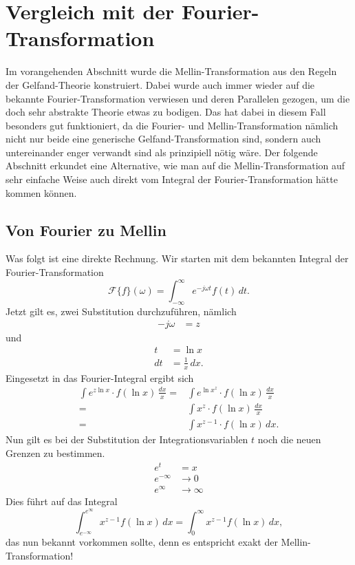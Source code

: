 %
%
%
%
\section{Vergleich mit der Fourier-Transformation
\label{mellin:section:teil3}}
Im vorangehenden Abschnitt wurde die Mellin-Transformation aus den 
Regeln der Gelfand-Theorie konstruiert. 
Dabei wurde auch immer wieder auf die bekannte Fourier-Transformation 
verwiesen und deren Parallelen gezogen, um die doch sehr abstrakte 
Theorie etwas zu bodigen.
Das hat dabei in diesem Fall besonders gut funktioniert, da die 
Fourier- und Mellin-Transformation nämlich nicht nur beide eine 
generische Gelfand-Transformation sind, sondern auch untereinander 
enger verwandt sind als prinzipiell nötig wäre.
Der folgende Abschnitt erkundet eine Alternative, wie man auf die 
Mellin-Transformation auf sehr einfache Weise auch direkt vom 
Integral der Fourier-Transformation hätte kommen können.

\subsection{Von Fourier zu Mellin
\label{mellin:subsection:foumel}}
Was folgt ist eine direkte Rechnung.
Wir starten mit dem bekannten Integral der Fourier-Trans\-for\-ma\-tion
\begin{equation}
    \mathcal{F}\{f \}(\omega) 
    = \int_{-\infty}^{\infty} e^{-j\omega{}t} f(t) \,{d}t
    .
    \label{mellin:fourier}
\end{equation}
Jetzt gilt es, zwei Substitution durchzuführen, nämlich
\begin{align*}
    -j\omega &= z
\end{align*}
und
\begin{align*}
    t &= \ln x \\
    {d}t &= \frac{1}{x}\,{d}x
    .
\end{align*}
Eingesetzt in das Fourier-Integral ergibt sich
\begin{align*}
    \int e^{z \ln x} \cdot f(\ln x) \,\frac{{d}x}{x}
    = &\int e^{\ln x^z} \cdot f(\ln x) \,\frac{{d}x}{x} \\
    = &\int x^{z} \cdot f(\ln x) \,\frac{{d}x}{x} \\
    = &\int x^{z-1} \cdot f(\ln x) \,{d}x
    .
\end{align*}
Nun gilt es bei der Substitution der Integrationsvariablen $t$ 
noch die neuen Grenzen zu bestimmen.
\begin{align*}
    e^{t} &= x \\
    e^{-\infty} &\rightarrow 0 \\
    e^{\infty} &\rightarrow \infty 
\end{align*}
Dies führt auf das Integral
\[
    \int_{e^{-\infty}}^{e^{\infty}} x^{z-1} f(\ln x) \,{d}x 
    = \int_{0}^{\infty} x^{z-1} f(\ln x) \,{d}x
    ,
\]
das nun bekannt vorkommen sollte, denn es entspricht exakt der 
Mellin-Transformation!
\medskip

